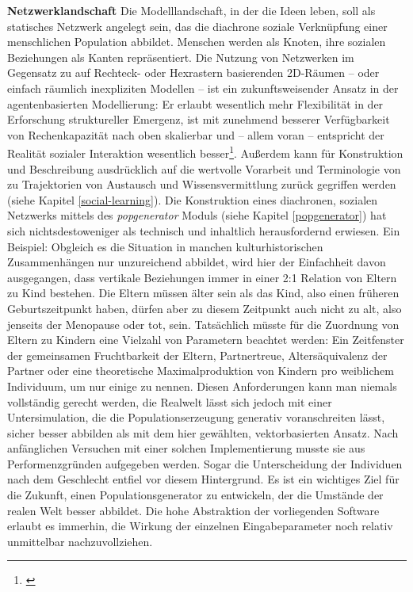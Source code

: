 \documentclass[openany,twoside,twocolumn]{book}
\let\rmarkdownfootnote\footnote%
\def\footnote{\protect\rmarkdownfootnote}
\begin{document}
\textbf{Netzwerklandschaft} \newline 
Die Modelllandschaft, in der die Ideen leben, soll als statisches Netzwerk angelegt sein, das die diachrone soziale Verknüpfung einer menschlichen Population abbildet. Menschen werden als Knoten, ihre sozialen Beziehungen als Kanten repräsentiert. Die Nutzung von Netzwerken im Gegensatz zu auf Rechteck- oder Hexrastern basierenden 2D-Räumen -- oder einfach räumlich inexpliziten Modellen -- ist ein zukunftsweisender Ansatz in der agentenbasierten Modellierung: Er erlaubt wesentlich mehr Flexibilität in der Erforschung struktureller Emergenz, ist mit zunehmend besserer Verfügbarkeit von Rechenkapazität nach oben skalierbar und -- allem voran -- entspricht der Realität sozialer Interaktion wesentlich besser\footnote{\textcite{lehmann_complex_2018}}. Außerdem kann für Konstruktion und Beschreibung ausdrücklich auf die wertvolle Vorarbeit und Terminologie von \textcite{cavalli-sforza_cultural_1981} zu Trajektorien von Austausch und Wissensvermittlung zurück gegriffen werden (siehe Kapitel \ref{social-learning}). Die Konstruktion eines diachronen, sozialen Netzwerks mittels des \emph{popgenerator} Moduls (siehe Kapitel \ref{popgenerator}) hat sich nichtsdestoweniger als technisch und inhaltlich herausfordernd erwiesen. Ein Beispiel: Obgleich es die Situation in manchen kulturhistorischen Zusammenhängen nur unzureichend abbildet, wird hier der Einfachheit davon ausgegangen, dass vertikale Beziehungen immer in einer 2:1 Relation von Eltern zu Kind bestehen. Die Eltern müssen älter sein als das Kind, also einen früheren Geburtszeitpunkt haben, dürfen aber zu diesem Zeitpunkt auch nicht zu alt, also jenseits der Menopause oder tot, sein. Tatsächlich müsste für die Zuordnung von Eltern zu Kindern eine Vielzahl von Parametern beachtet werden: Ein Zeitfenster der gemeinsamen Fruchtbarkeit der Eltern, Partnertreue, Altersäquivalenz der Partner oder eine theoretische Maximalproduktion von Kindern pro weiblichem Individuum, um nur einige zu nennen. Diesen Anforderungen kann man niemals vollständig gerecht werden, die Realwelt lässt sich jedoch mit einer Untersimulation, die die Populationserzeugung generativ voranschreiten lässt, sicher besser abbilden als mit dem hier gewählten, vektorbasierten Ansatz. Nach anfänglichen Versuchen mit einer solchen Implementierung musste sie aus Performenzgründen aufgegeben werden. Sogar die Unterscheidung der Individuen nach dem Geschlecht entfiel vor diesem Hintergrund. Es ist ein wichtiges Ziel für die Zukunft, einen Populationsgenerator zu entwickeln, der die Umstände der realen Welt besser abbildet. Die hohe Abstraktion der vorliegenden Software erlaubt es immerhin, die Wirkung der einzelnen Eingabeparameter noch relativ unmittelbar nachzuvollziehen.
\end{document}
